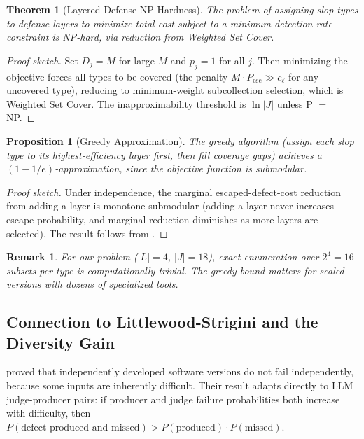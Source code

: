 \documentclass[11pt, a4paper, logo, copyright]{googledeepmind}
\newtheorem{theorem}{Theorem}[section]
\newtheorem{proposition}{Proposition}[section]
\newtheorem*{remark}{Remark}
\begin{document}
\begin{theorem}[Layered Defense NP-Hardness]
\label{thm:defense-nphard}
The problem of assigning slop types to defense layers to minimize total cost subject to a minimum detection rate constraint is NP-hard, via reduction from Weighted Set Cover.
\end{theorem}

\begin{proof}[Proof sketch]
Set $D_j = M$ for large $M$ and $p_j = 1$ for all $j$. Then minimizing the objective forces all types to be covered (the penalty $M \cdot P_{\mathrm{esc}} \gg c_\ell$ for any uncovered type), reducing to minimum-weight subcollection selection, which is Weighted Set Cover. The inapproximability threshold is $\ln |J|$ unless P $=$ NP.
\end{proof}

\begin{proposition}[Greedy Approximation]
\label{prop:greedy-defense}
The greedy algorithm (assign each slop type to its highest-efficiency layer first, then fill coverage gaps) achieves a $(1-1/e)$-approximation, since the objective function is submodular.
\end{proposition}

\begin{proof}[Proof sketch]
Under independence, the marginal escaped-defect-cost reduction from adding a layer is monotone submodular (adding a layer never increases escape probability, and marginal reduction diminishes as more layers are selected). The result follows from \citet{nemhauser1978}.
\end{proof}

\begin{remark}
For our problem ($|L| = 4$, $|J| = 18$), exact enumeration over $2^4 = 16$ subsets per type is computationally trivial. The greedy bound matters for scaled versions with dozens of specialized tools.
\end{remark}

\subsection{Connection to Littlewood-Strigini and the Diversity Gain}

\citet{littlewood1993, littlewood2000} proved that independently developed software versions do not fail independently, because some inputs are inherently difficult. Their result adapts directly to LLM judge-producer pairs: if producer and judge failure probabilities both increase with difficulty, then $P(\text{defect produced and missed}) > P(\text{produced}) \cdot P(\text{missed})$.
\end{document}
